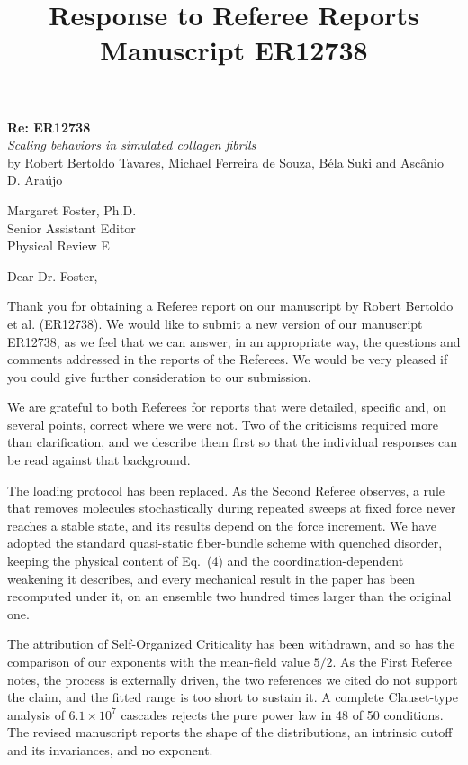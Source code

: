 \documentclass[11pt]{article}
\title{\textbf{Response to Referee Reports}\\[0.35em]
  \large Manuscript ER12738}
\author{}
\date{}
\begin{document}
\begin{flushleft}
  \textbf{Re: ER12738}\\
  \textit{Scaling behaviors in simulated collagen fibrils}\\
  by Robert Bertoldo Tavares, Michael Ferreira de Souza, Béla Suki and Ascânio D. Araújo
  
  \medskip
  
  Margaret Foster, Ph.D.\\
  Senior Assistant Editor\\
  Physical Review E
  
  \medskip
  
  Dear Dr. Foster,
  
  \medskip
  
  Thank you for obtaining a Referee report on our manuscript by Robert Bertoldo et al. (ER12738).
  We would like to submit a new version of our manuscript ER12738, as we feel that we can answer, in an appropriate way, the questions and comments addressed in the reports of the Referees. We would be very pleased if you could give further consideration to our submission.
\end{flushleft}

\bigskip

\maketitle
\vspace{-2.5em}



\bigskip

We are grateful to both Referees for reports that were detailed, specific and,
on several points, correct where we were not. Two of the criticisms required
more than clarification, and we describe them first so that the individual
responses can be read against that background.

The loading protocol has been replaced. As the Second Referee observes, a rule
that removes molecules stochastically during repeated sweeps at fixed force
never reaches a stable state, and its results depend on the force increment. We
have adopted the standard quasi-static fiber-bundle scheme with quenched
disorder, keeping the physical content of Eq.~(4) and the coordination-dependent
weakening it describes, and every mechanical result in the paper has been
recomputed under it, on an ensemble two hundred times larger than the original
one.

The attribution of Self-Organized Criticality has been withdrawn, and so has the
comparison of our exponents with the mean-field value $5/2$. As the First
Referee notes, the process is externally driven, the two references we cited do
not support the claim, and the fitted range is too short to sustain it. A
complete Clauset-type analysis of $6.1\times10^{7}$ cascades rejects the pure
power law in 48 of 50 conditions. The revised manuscript reports the shape of
the distributions, an intrinsic cutoff and its invariances, and no exponent.
\end{document}

